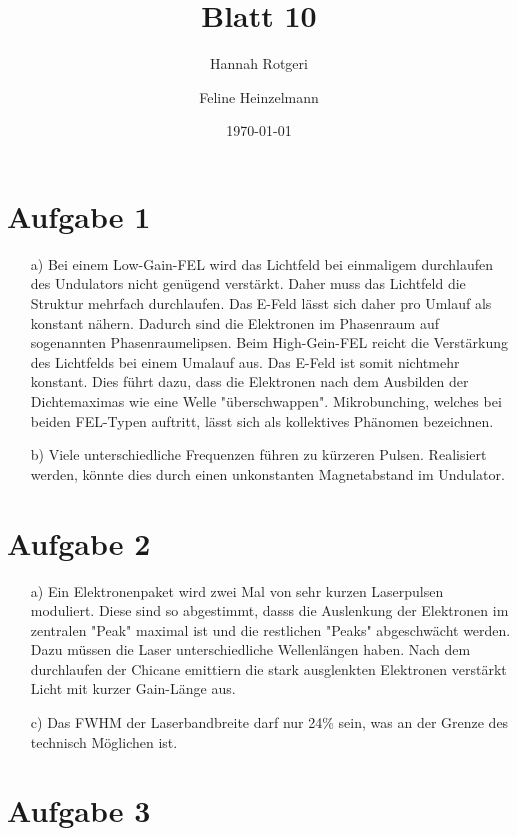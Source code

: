 \documentclass[11pt,a4paper]{article}
\title{Blatt 10}
\date{\today}
\author{Hannah Rotgeri \and Feline Heinzelmann}
\begin{document}
    \maketitle

    \section*{Aufgabe 1}
	\begin{itemize}
		\item[a)] 
			Bei einem Low-Gain-FEL wird das Lichtfeld bei einmaligem durchlaufen des Undulators nicht genügend verstärkt.
			Daher muss das Lichtfeld die Struktur mehrfach durchlaufen. Das E-Feld lässt sich daher pro Umlauf als konstant nähern.
			Dadurch sind die Elektronen im Phasenraum auf sogenannten Phasenraumelipsen.
			Beim High-Gein-FEL reicht die Verstärkung des Lichtfelds bei einem Umalauf aus.
			Das E-Feld ist somit nichtmehr konstant.
			Dies führt dazu, dass die Elektronen nach dem Ausbilden der Dichtemaximas wie eine Welle "überschwappen".
			Mikrobunching, welches bei beiden FEL-Typen auftritt, lässt sich als kollektives Phänomen bezeichnen.
		\item[b)]
			Viele unterschiedliche Frequenzen führen zu kürzeren Pulsen. 
			Realisiert werden, könnte dies durch einen unkonstanten Magnetabstand im Undulator.

	\end{itemize}


	
    \section*{Aufgabe 2}
	\begin{itemize}
		\item[a)] 
			Ein Elektronenpaket wird zwei Mal von sehr kurzen Laserpulsen moduliert.
			Diese sind so abgestimmt, dasss die Auslenkung der Elektronen im zentralen "Peak" maximal ist
			und die restlichen "Peaks" abgeschwächt werden.
			Dazu müssen die Laser unterschiedliche Wellenlängen haben.
			Nach dem durchlaufen der Chicane emittiern die stark ausglenkten Elektronen verstärkt Licht mit kurzer Gain-Länge aus.
		\item[c)]
			Das FWHM der Laserbandbreite darf nur 24\% sein, was an der Grenze des technisch Möglichen ist.
	\end{itemize}

	\section*{Aufgabe 3}
\end{document}
